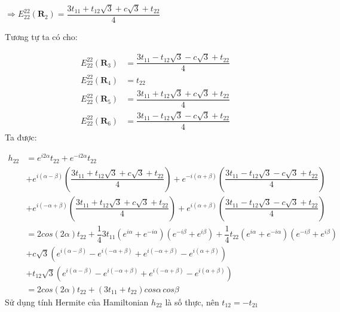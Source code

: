 \documentclass{report}
\begin{document}
$\Rightarrow E_{22}^{22}(\mathbf{R}_2) = \dfrac{3t_{11} + t_{12}\sqrt{3} + c\sqrt{3} + t_{22}}{4}$

Tương tự ta có cho:

\begin{align}
    E_{22}^{22}(\mathbf{R}_3) & = \dfrac{3t_{11} - t_{12}\sqrt{3} - c\sqrt{3} + t_{22}}{4} \nonumber \\
    E_{22}^{22}(\mathbf{R}_4) & = t_{22} \nonumber                                                   \\
    E_{22}^{22}(\mathbf{R}_5) & = \dfrac{3t_{11} + t_{12}\sqrt{3} + c\sqrt{3} + t_{22}}{4} \nonumber \\
    E_{22}^{22}(\mathbf{R}_6) & = \dfrac{3t_{11} - t_{12}\sqrt{3} - c\sqrt{3} + t_{22}}{4} \nonumber
\end{align}
\clearpage
Ta được:

\begin{align}
    h_{22} & = e^{ i 2 \alpha} t_{22} + e^{- i 2 \alpha} t_{22} \nonumber                                                                                                                                                                           \\
           & + e^{i(\alpha - \beta)} \left(\dfrac{3t_{11} + t_{12}\sqrt{3} + c\sqrt{3} + t_{22}}{4}\right) +  e^{-i(\alpha + \beta)} \left(\dfrac{3t_{11} - t_{12}\sqrt{3} - c\sqrt{3} + t_{22}}{4}\right) \nonumber                                \\
           & + e^{i(-\alpha + \beta)} \left(\dfrac{3t_{11} + t_{12}\sqrt{3} + c\sqrt{3} + t_{22}}{4}\right) +  e^{i(\alpha + \beta)} \left(\dfrac{3t_{11} - t_{12}\sqrt{3} - c\sqrt{3} + t_{22}}{4}\right) \nonumber                                \\
           & = 2 cos(2\alpha) t_{22} + \dfrac{1}{4}3t_{11} \left(e^{i\alpha} + e^{-i\alpha}\right)\left(e^{-i\beta} + e^{i\beta}\right) + \dfrac{1}{4}t_{22} \left(e^{i\alpha} + e^{-i\alpha}\right)\left(e^{-i\beta} + e^{i\beta}\right) \nonumber \\
           & + c\sqrt{3}(e^{i(\alpha-\beta)} - e^{i(-\alpha+\beta)} +e^{i(-\alpha+\beta)} - e^{i(\alpha+\beta)}) \nonumber                                                                                                                          \\
           & + t_{12}\sqrt{3}(e^{i(\alpha-\beta)} - e^{i(-\alpha+\beta)} + e^{i(-\alpha+\beta)} - e^{i(\alpha+\beta)}) \nonumber                                                                                                                    \\
           & = 2cos(2\alpha) t_{22} + (3t_{11} + t_{22})cos\alpha \, cos\beta \nonumber
\end{align}
Sử dụng tính Hermite của Hamiltonian $h_{22}$ là số thực, nên $t_{12}= - t_{21}$
\end{document}
